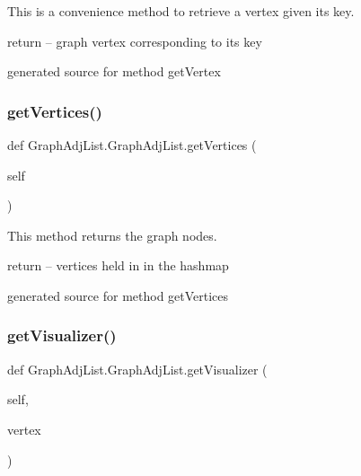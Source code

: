 This is a convenience method to retrieve a vertex given its key. 

return -- graph vertex corresponding to its key\begin{DoxyVerb}generated source for method getVertex \end{DoxyVerb}
 \hypertarget{class_graph_adj_list_1_1_graph_adj_list_a5921cc09aba4d4b61d5cb5e97ee6473f}{}\label{class_graph_adj_list_1_1_graph_adj_list_a5921cc09aba4d4b61d5cb5e97ee6473f} 
\subsubsection{\texorpdfstring{get\+Vertices()}{getVertices()}}
{\footnotesize\ttfamily def Graph\+Adj\+List.\+Graph\+Adj\+List.\+get\+Vertices (\begin{DoxyParamCaption}\item[{}]{self }\end{DoxyParamCaption})}



This method returns the graph nodes. 

return -- vertices held in in the hashmap\begin{DoxyVerb}generated source for method getVertices \end{DoxyVerb}
 \hypertarget{class_graph_adj_list_1_1_graph_adj_list_ac5526b72818cd4f4f939a42cb173ada3}{}\label{class_graph_adj_list_1_1_graph_adj_list_ac5526b72818cd4f4f939a42cb173ada3} 
\subsubsection{\texorpdfstring{get\+Visualizer()}{getVisualizer()}}
{\footnotesize\ttfamily def Graph\+Adj\+List.\+Graph\+Adj\+List.\+get\+Visualizer (\begin{DoxyParamCaption}\item[{}]{self,  }\item[{}]{vertex }\end{DoxyParamCaption})}



